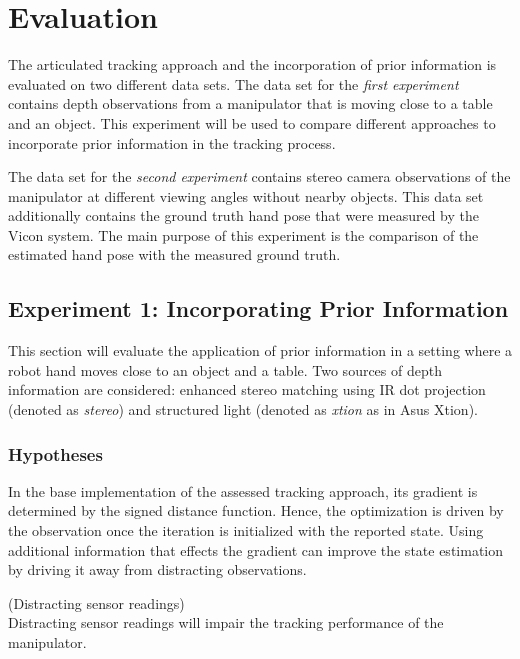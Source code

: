\chapter{Evaluation}
\label{sec:evaluation}

The articulated tracking approach and the incorporation of prior information is evaluated on two different data sets. The data set for the \textit{first experiment} contains depth observations from a manipulator that is moving close to a table and an object. This experiment will be used to compare different approaches to incorporate prior information in the tracking process.

The data set for the \textit{second experiment} contains stereo camera observations of the manipulator at different viewing angles without nearby objects. This data set additionally contains the ground truth hand pose that were measured by the Vicon system. The main purpose of this experiment is the comparison of the estimated hand pose with the measured ground truth.

\section{Experiment 1: Incorporating Prior Information}

This section will evaluate the application of prior information in a setting where a robot hand moves close to an object and a table. Two sources of depth information are considered: enhanced stereo matching using IR dot projection (denoted as \emph{stereo}) and structured light (denoted as \emph{xtion} as in Asus Xtion).

\subsection{Hypotheses}

In the base implementation of the assessed tracking approach, its gradient is determined by the signed distance function. Hence, the optimization is driven by the observation once the iteration is initialized with the reported state. Using additional information that effects the gradient can improve the state estimation by driving it away from distracting observations.

\begin{hypothesis}(Distracting sensor readings)\\
Distracting sensor readings will impair the tracking performance of the manipulator.
\label{hyp:distracting_readings}
\end{hypothesis}

